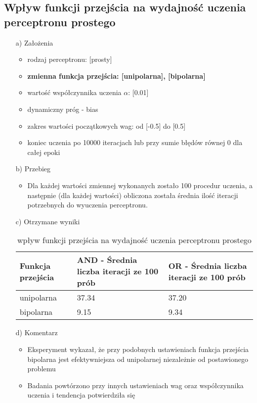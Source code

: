 \documentclass[17pt]{article}
\begin{document}
\subsection{Wpływ funkcji przejścia na wydajność uczenia perceptronu prostego}
\vspace{4mm}
\begin{enumerate}

\item[a)] Założenia

\begin{itemize}
\item rodzaj perceptronu: [prosty]
\item \textbf{zmienna funkcja przejścia: [unipolarna], [bipolarna]}
\item wartość współczynnika uczenia $\alpha$: [0.01]
\item dynamiczny próg - bias
\item zakres wartości początkowych wag: od [-0.5] do [0.5]
\item koniec uczenia po 10000 iteracjach lub przy sumie błędów równej 0 dla całej epoki
\end{itemize}

\item[b)] Przebieg

\begin{itemize}
\item Dla każdej wartości zmiennej wykonanych zostało 100 procedur uczenia, a następnie (dla każdej wartości) obliczona została średnia ilość iteracji potrzebnych do wyuczenia perceptronu.
\end{itemize}
\item[c)] Otrzymane wyniki

\begin{table}[ht]
\centering
\begin{tabular}{|p{4cm}|p{4cm}|p{4cm}|}
 \hline
 Funkcja przejścia & AND - Średnia liczba iteracji ze 100 prób & OR - Średnia liczba iteracji ze 100 prób\\ \hline
 unipolarna & 37.34 & 37.20\\ 
 bipolarna & 9.15 & 9.34\\ 
 \hline
\end{tabular}
\caption{\label{tab:table4}wpływ funkcji przejścia na wydajność uczenia perceptronu prostego}
\end{table}

\item[d)] Komentarz

\begin{itemize}
\item Eksperyment wykazał, że przy podobnych ustawieniach funkcja przejścia bipolarna jest efektywniejsza od unipolarnej niezależnie od postawionego problemu
\item Badania powtórzono przy innych ustawieniach wag oraz współczynnika uczenia i tendencja potwierdziła się
\end{itemize}

\end{enumerate}
\end{document}
